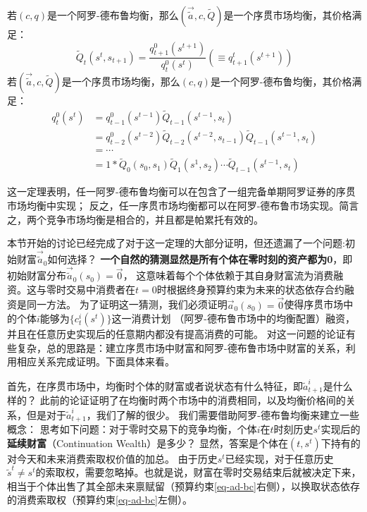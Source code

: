 \begin{theorem}
    若$\left(c,q\right)$是一个阿罗-德布鲁均衡，那么$(\vec{\tilde{a}},c,\tilde{Q})$是一个序贯市场均衡，其价格满足：
    \begin{equation}
        \tilde{Q}_t\left(s^t,s_{t+1}\right) = \frac{q_{t+1}^0\left(s^{t+1}\right)}{q_t^0\left(s^t\right)}
            (\equiv q_{t+1}^t\left(s^{t+1}\right))
    \end{equation}
    若$(\vec{\tilde{a}},c,\tilde{Q})$是一个序贯市场均衡，那么$\left(c,q\right)$是一个阿罗-德布鲁均衡，其价格满足：
    \begin{equation}
        \begin{aligned}
            q_{t}^0\left(s^{t}\right) &= q_{t-1}^0\left(s^{t-1}\right) \tilde{Q}_{t-1}\left(s^{t-1},s_{t}\right)    \\
                &= q_{t-2}^0\left(s^{t-2}\right)\tilde{Q}_{t-2}\left(s^{t-2},s_{t-1}\right)\tilde{Q}_{t-1}\left(s^{t-1},s_{t}\right)  \\
                &= \cdots   \\
                &= 1*\tilde{Q}_0\left(s_0,s_1\right)\tilde{Q}_1\left(s^1,s_2\right)\cdots \tilde{Q}_{t-1}\left(s^{t-1},s_{t}\right)
        \end{aligned}
    \end{equation}
\end{theorem}

这一定理表明，任一阿罗-德布鲁均衡可以在包含了一组完备单期阿罗证券的序贯市场均衡中实现；
反之，任一序贯市场均衡都可以在阿罗-德布鲁市场实现。简言之，两个竞争市场均衡是相合的，并且都是帕累托有效的。

本节开始的讨论已经完成了对于这一定理的大部分证明，但还遗漏了一个问题:初始财富$\vec{\tilde{a}}_0$如何选择？
\textbf{一个自然的猜测显然是所有个体在零时刻的资产都为0}，即初始财富分布$\vec{\tilde{a}}_0\left(s_0\right)=\vec{0}$，
这意味着每个个体依赖于其自身财富流为消费融资。这与零时交易中消费者在$t=0$时根据终身预算约束为未来的状态依存合约融资是同一方法。
为了证明这一猜测，我们必须证明$\vec{a}_0\left(s_0\right)=\vec{0}$使得序贯市场中的个体$i$能够为$\{c_t^i\left(s^t\right)\}$这一消费计划
（阿罗-德布鲁市场中的均衡配置）融资，并且在任意历史实现后的任意期内都没有提高消费的可能。
对这一问题的论证有些复杂，总的思路是：建立序贯市场中财富和阿罗-德布鲁市场中财富的关系，利用相应关系完成证明。下面具体来看。

首先，在序贯市场中，均衡时个体的财富或者说状态有什么特征，即$\tilde{a}_{t+1}^i$是什么样的？
此前的论证证明了在均衡时两个市场中的消费相同，以及均衡价格间的关系，但是对于$\tilde{a}_{t+1}^i$，我们了解的很少。
我们需要借助阿罗-德布鲁均衡来建立一些概念：
思考如下问题：对于零时交易下的竞争均衡，个体$i$在$t$时刻历史$s^t$实现后的\textbf{延续财富}（Continuation Wealth）是多少？
显然，答案是个体在$(t,s^t)$下持有的对今天和未来消费索取权价值的加总。
由于历史$s^t$已经实现，对于任意历史$\tilde{s}^t \neq s^t$的索取权，需要忽略掉。也就是说，财富在零时交易结束后就被决定下来，
相当于个体出售了其全部未来禀赋留（预算约束\ref{eq-ad-bc}右侧），以换取状态依存的消费索取权（预算约束\ref{eq-ad-bc}左侧）。

